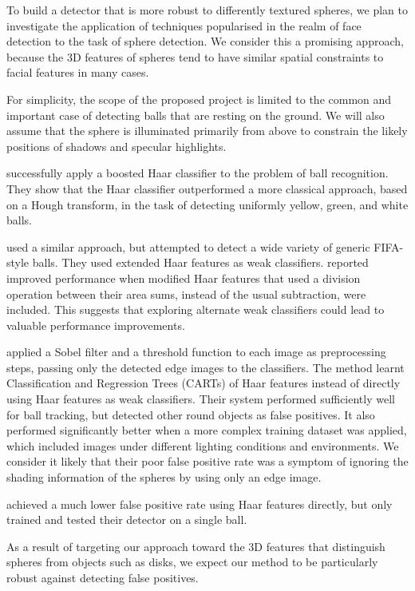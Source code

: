 \documentclass{llncs}
\begin{document}
{        To build a detector that is more robust to differently textured spheres, we plan to investigate the application of techniques popularised in the realm of face detection to the task of sphere detection. We consider this a promising approach, because the 3D features of spheres tend to have similar spatial constraints to facial features in many cases.

        For simplicity, the scope of the proposed project is limited to the common and important case of detecting balls that are resting on the ground. We will also assume that the sphere is illuminated primarily from above to constrain the likely positions of shadows and specular highlights.

        \citet{masselli2013haar} successfully apply a boosted Haar classifier \citep{viola2001robust} to the problem of ball recognition. They show that the Haar classifier outperformed a more classical approach, based on a Hough transform, in the task of detecting uniformly yellow, green, and white balls.

        \citet{zhang2013novel} used a similar approach, but attempted to detect a wide variety of generic FIFA-style balls. They used extended Haar features \citep{Lienhart2002extended} as weak classifiers. \citet{zhang2013novel} reported improved performance when modified Haar features that used a division operation between their area sums, instead of the usual subtraction, were included. This suggests that exploring alternate weak classifiers could lead to valuable performance improvements.

        \citet{mitri2004fast} applied a Sobel filter and a threshold function to each image as preprocessing steps, passing only the detected edge images to the classifiers. The method learnt Classification and Regression Trees (CARTs) of Haar features instead of directly using Haar features as weak classifiers. Their system performed sufficiently well for ball tracking, but detected other round objects as false positives. It also performed significantly better when a more complex training dataset was applied, which included images under different lighting conditions and environments. We consider it likely that their poor false positive rate was a symptom of ignoring the shading information of the spheres by using only an edge image.

        \citet{treptow2004filter} achieved a much lower false positive rate using Haar features directly, but only trained and tested their detector on a single ball.

        As a result of targeting our approach toward the 3D features that distinguish spheres from objects such as disks, we expect our method to be particularly robust against detecting false positives.

    }
\end{document}
